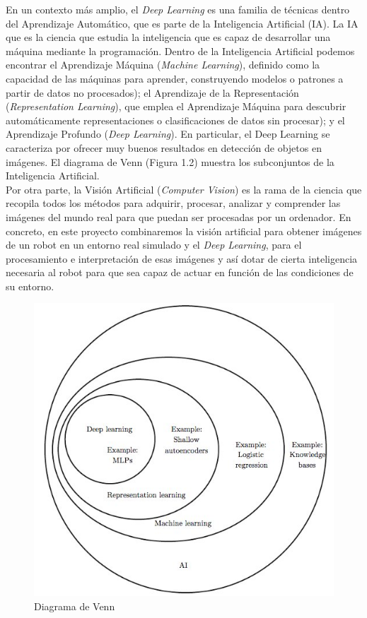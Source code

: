 \documentclass{report}
\begin{document}
En un contexto más amplio, el \textit{Deep Learning} es una familia de técnicas dentro del Aprendizaje Automático, que es parte de la Inteligencia Artificial (IA). La IA que es la ciencia que estudia la inteligencia que es capaz de desarrollar una máquina mediante la programación. Dentro de la Inteligencia Artificial podemos encontrar el Aprendizaje Máquina (\textit{Machine Learning}), definido como la capacidad de las máquinas para aprender, construyendo modelos o patrones a partir de datos no procesados); el Aprendizaje de la Representación (\textit{Representation Learning}), que emplea el Aprendizaje Máquina para descubrir automáticamente representaciones o clasificaciones de datos sin procesar); y el Aprendizaje Profundo (\textit{Deep Learning}). En particular, el Deep Learning se caracteriza por ofrecer muy buenos resultados en detección de objetos en imágenes. El diagrama de Venn (Figura 1.2) muestra los subconjuntos de la Inteligencia Artificial. \cite{IA}
\\

Por otra parte, la Visión Artificial (\textit{Computer Vision}) es la rama de la ciencia que recopila todos los métodos para adquirir, procesar, analizar y comprender las imágenes del mundo real para que puedan ser procesadas por un ordenador. En concreto, en este proyecto combinaremos la visión artificial para obtener imágenes de un robot en un entorno real simulado y el \textit{Deep Learning}, para el procesamiento e interpretación de esas imágenes y así dotar de cierta inteligencia necesaria al robot para que sea capaz de actuar en función de las condiciones de su entorno. 

\renewcommand{\figurename}{Figura}		
\begin{figure}[h]
	\centering
	 \includegraphics[scale=0.5]{images/diagrama-venn.jpg}
	 \caption{Diagrama de Venn}
\end{figure}
\end{document}

